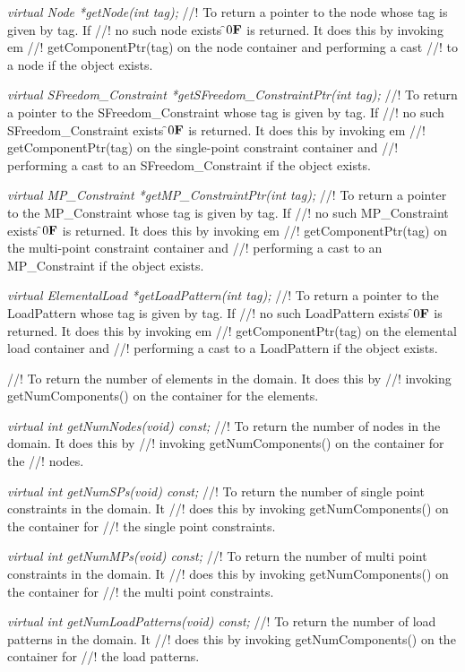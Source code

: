 {\em virtual  Node *getNode(int tag);}
//! To return a pointer to the node whose tag is given by \p tag. If
//! no such node exists \f$0{\bf F}$ is returned. It does this by invoking {em
//! getComponentPtr(tag)} on the node container and performing a cast
//! to a node if the object exists. 

{\em virtual  SFreedom\_Constraint *getSFreedom\_ConstraintPtr(int tag);}
//! To return a pointer to the SFreedom\_Constraint whose tag is given by \p tag. If
//! no such SFreedom\_Constraint exists \f$0{\bf F}$ is returned. It does this by invoking {em
//! getComponentPtr(tag)} on the single-point constraint container and
//! performing a cast to an SFreedom\_Constraint if the object exists. 


{\em virtual  MP\_Constraint *getMP\_ConstraintPtr(int tag);}
//! To return a pointer to the MP\_Constraint whose tag is given by \p tag. If
//! no such MP\_Constraint exists \f$0{\bf F}$ is returned. It does this by invoking {em
//! getComponentPtr(tag)} on the multi-point constraint container and
//! performing a cast to an MP\_Constraint if the object exists. 


{\em virtual  ElementalLoad *getLoadPattern(int tag);}
//! To return a pointer to the LoadPattern whose tag is given by \p tag. If
//! no such LoadPattern exists \f$0{\bf F}$ is returned. It does this by invoking {em
//! getComponentPtr(tag)} on the elemental load container and
//! performing a cast to a LoadPattern if the object exists. 


//! To return the number of elements in the domain. It does this by
//! invoking getNumComponents() on the container for the elements. 

{\em virtual int getNumNodes(void) const;}
//! To return the number of nodes in the domain. It does this by
//! invoking getNumComponents() on the container for the
//! nodes. 

{\em virtual int getNumSPs(void) const;}
//! To return the number of single point constraints in the domain. It
//! does this by invoking getNumComponents() on the container for
//! the single point constraints. 

{\em virtual int getNumMPs(void) const;}
//! To return the number of multi point constraints in the domain. It
//! does this by invoking getNumComponents() on the container for
//! the multi point constraints. 

{\em virtual int getNumLoadPatterns(void) const;}
//! To return the number of load patterns in the domain. It
//! does this by invoking getNumComponents() on the container for
//! the load patterns. 

